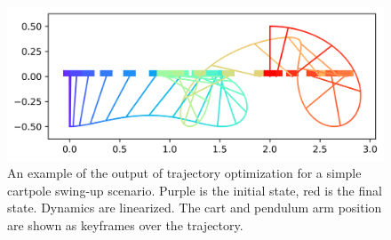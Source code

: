 \documentclass{exam}
\begin{document}
\begin{figure}[H]
    \includegraphics[width=0.9\linewidth]{cartpole_swingy.png}
    \centering
    \caption{An example of the output of trajectory optimization for a simple cartpole swing-up scenario. Purple is the initial state, red is the final state. Dynamics are linearized. The cart and pendulum arm position are shown as keyframes over the trajectory.}
    \label{fig:cartpole-swingy}
\end{figure}
\end{document}
